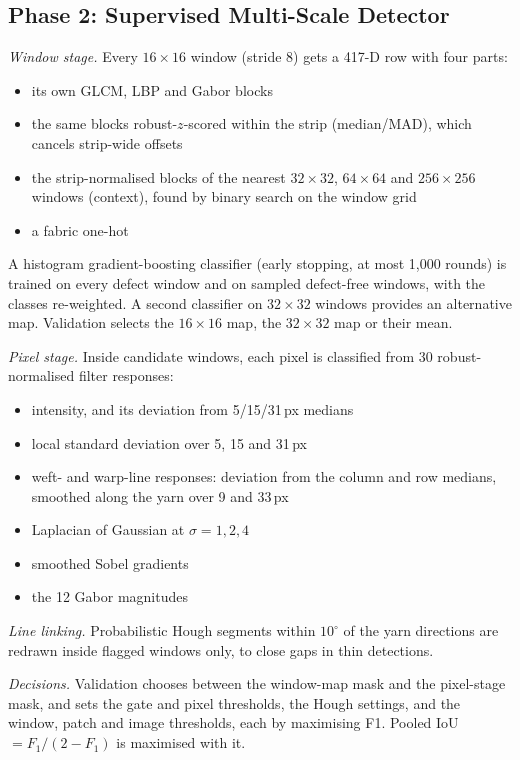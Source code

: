 \documentclass[conference]{IEEEtran}
\begin{document}
\subsection{Phase 2: Supervised Multi-Scale Detector}
\emph{Window stage.} Every $16\times16$ window (stride 8) gets a 417-D row with four parts:
\begin{itemize}
  \item its own GLCM, LBP and Gabor blocks
  \item the same blocks robust-$z$-scored within the strip (median/MAD), which cancels strip-wide offsets
  \item the strip-normalised blocks of the nearest $32\times32$, $64\times64$ and $256\times256$ windows (context), found by binary search on the window grid
  \item a fabric one-hot
\end{itemize}
A histogram gradient-boosting classifier \cite{friedman2001,ke2017} (early stopping, at most 1{,}000 rounds) is trained on every defect window and on sampled defect-free windows, with the classes re-weighted. A second classifier on $32\times32$ windows provides an alternative map. Validation selects the $16\times16$ map, the $32\times32$ map or their mean.

\emph{Pixel stage.} Inside candidate windows, each pixel is classified from 30 robust-normalised filter responses:
\begin{itemize}
  \item intensity, and its deviation from 5/15/31\,px medians
  \item local standard deviation over 5, 15 and 31\,px
  \item weft- and warp-line responses: deviation from the column and row medians, smoothed along the yarn over 9 and 33\,px
  \item Laplacian of Gaussian at $\sigma=1,2,4$
  \item smoothed Sobel gradients
  \item the 12 Gabor magnitudes
\end{itemize}

\emph{Line linking.} Probabilistic Hough segments \cite{matas2000} within $10^\circ$ of the yarn directions are redrawn inside flagged windows only, to close gaps in thin detections.

\emph{Decisions.} Validation chooses between the window-map mask and the pixel-stage mask, and sets the gate and pixel thresholds, the Hough settings, and the window, patch and image thresholds, each by maximising F1. Pooled IoU $=F_1/(2-F_1)$ is maximised with it.
\end{document}
